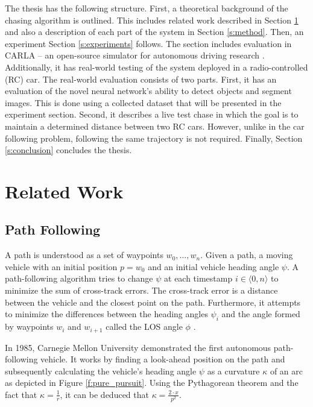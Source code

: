 \documentclass{ctuthesis/ctuthesis}
\begin{document}
The thesis has the following structure. First, a theoretical background of the chasing algorithm is outlined. This includes related work described in Section \ref{s:related_work} and also a description of each part of the system in Section \ref{s:method}. Then, an experiment Section \ref{s:experiments} follows. The section includes evaluation in CARLA -- an open-source simulator for autonomous driving research \cite{CARLA}. Additionally, it has real-world testing of the system deployed in a radio-controlled (RC) car. The real-world evaluation consists of two parts. First, it has an evaluation of the novel neural network's ability to detect objects and segment images. This is done using a collected dataset that will be presented in the experiment section. Second, it describes a live test chase in which the goal is to maintain a determined distance between two RC cars. However, unlike in the car following problem, following the same trajectory is not required. Finally, Section \ref{s:conclusion} concludes the thesis.




\chapter{Related Work}\label{s:related_work}
\section{Path Following}
A path is understood as a set of waypoints $w_0,\dots ,w_n$. Given a path, a moving vehicle with an initial position $p=w_0$ and an initial vehicle heading angle $\psi$. A path-following algorithm tries to change $\psi$ at each timestamp $i \in \langle 0,n\rangle$ to minimize the sum of cross-track errors. The cross-track error is a distance between the vehicle and the closest point on the path. Furthermore, it attempts to minimize the differences between the heading angles $\psi_i$ and the angle formed by waypoints $w_i$ and $w_{i+1}$ called the LOS angle $\phi$ \cite{path_following_evaluation}.\par

In 1985, Carnegie Mellon University \cite{pure_pursuit_orig} demonstrated the first autonomous path-following vehicle. It works by finding a look-ahead position on the path and subsequently calculating the vehicle's heading angle $\psi$ as a curvature $\kappa$ of an arc as depicted in Figure \ref{f:pure_pursuit}. Using the Pythagorean theorem and the fact that $\kappa=\frac{1}{r}$, it can be deduced that $\kappa = \frac{2\cdot x}{p^2}$. \par
\end{document}
